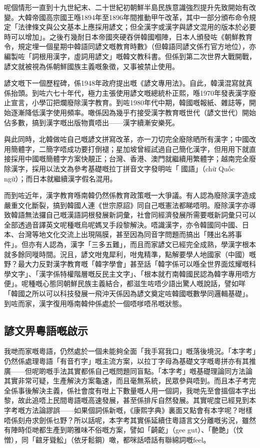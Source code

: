\documentclass[a5paper, 12pt, openany]{book} %
\begin{document}
呢個情形一直到十九世紀末、二十世紀初朝鮮半島民族意識強烈提升先致開始有改變。大韓帝國高宗國王喺1894年至1896年間推動甲午改革，其中一部分頒布命令規定「法律條文與公文基本上應採用諺文；但全漢字或漢字與諺文混用的版本於必要時可以增加」。之後冇幾耐日本帝國夾硬吞併韓國嗰陣，日本人頒發咗《朝鮮教育令，規定埋一個星期中韓語同諺文嘅教育時數》（但韓語同諺文係冇官方地位），亦編製咗「詞根用漢字，虛詞用諺文」嘅韓文教科書。但係到第二次世界大戰開戰，諺文就被視為係朝鮮國族主義嘅象徵，又事被禁止使用。

諺文嘅下一個歷程碑，係1948年政府提出嘅《諺文專用法》。自此，韓漢混寫就真係抬頭。到咗六七十年代，極力主張使用諺文嘅總統朴正熙，喺1970年發表漢字廢止宣言，小學冚把爛廢除漢字教育。到咗1980年代中期，韓國嘅報紙、雜誌等，開始逐漸降低漢字使用頻率。噉係因為幾乎冇接受漢字教育嘅世代（諺文世代）開始佔多數，搞到漢字嘅出版物賣唔出——漢字續漸安樂死。

與此同時，北韓做咗自己嘅諺文拼寫改革，亦一刀切完全廢除晒所有漢字；中國改用簡體字，二簡字唔成功要打倒褪；星加坡曾經試過自己簡化漢字，但用用下就直接採用中國嘅簡體字方案快靚正；台灣、香港、澳門就繼續用繁體字；越南完全廢除漢字，採用以法文為參考基礎嘅拉丁拼音文字發明咗「𡨸國語」（chữ
Quốc ngữ）；而日本就繼續漢字假名混用。

而到咗近年，漢字教育喺南韓仍然係教育政策嘅一大爭議。有人認為廢除漢字造成嚴重文化斷裂，搞到韓國人連《世宗原詔》同自己嘅憲法都睇唔明。廢除漢字亦導致韓語無法攞自己嘅漢語詞根發展新詞彙，社會同經濟發展所需要嘅新詞彙只可以全部透過音譯英文呢種嘅烏呢媽叉手段黎解決。唔識漢字，亦令韓國同中國、日本、台灣等地文化交流上出現隔膜，甚至因為同音字問題而搞出「賤出名將事件」。但亦有人認為，漢字「三多五難」，而且而家諺文已經完全成熟，學漢字根本就多餘同嘥時間。況且，諺文咁鬼犀利，咁鬼精準，點解要學人地國家（中國）嘅野？最大力反對漢字教育嘅「韓字學會」甚至話「韓字係可以喺全世界面炫耀嘅科學文字」、「漢字係特權階層嘅反民主文字」、「根本就冇南韓國民認為韓字專用唔方便」。呢種嘅心態同朝鮮民族主義結合，都滋生咗唔少語出驚人嘅說話，譬如咩「韓國之所以可以科技發展一飛沖天係因為諺文奠定咗韓國嘅數學同邏輯基礎」。到咗而家，漢字復用喺南韓仲係處於一個唔嗲唔吊嘅狀態。

\subsection*{諺文畀粵語嘅啟示}

我哋而家嘅粵語，仍然處於一個未能夠全面「我手寫我口」嘅落後境況。「本字考」仍然係處理粵語「有音冇字」嘅主流方案，以拉丁字母為基礎文字嘅粵拼亦有其推廣——但呢啲嘅手法其實都係自己嘅問題同盲點。「本字考」嘅基礎理論同方法論其實非常可疑，生產解決方案龜速，而且毫無系統，民眾參與唔到。而且本子考完全係事後解決主義，係社會度有咁上下數量嘅人用一個詞，我哋先至會搵個本字出黎，故此追唔上民間粵語嘅高速發展，甚至係排斥自然發展。其實呢度已經見到本字考嘅方法論謬誤——如果個詞係新嘅，《康熙字典》裏面又點會有本字呢？咁樣唔係刻舟求劍係乜野？所以話呢，本字考其實係延續住粵語言文分離嘅劣況，雖然有陣時佢哋都生產到啲雅味不俗嘅方案，譬如「齮齕」（gee
gut）、「䒐䒏」（忟憎），同「𪘲牙聳䚗」（依牙鬆鋼）噉，都咪話唔話有聯綿詞嘅feel。
\end{document}
